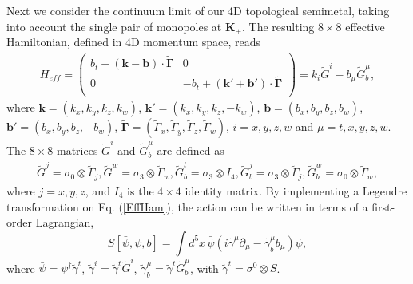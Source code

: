\documentclass[twocolumn,prl,10pt,superscriptaddress]{revtex4}
\begin{document}
\begin{appendix}
Next we consider the continuum limit of our 4D topological semimetal, taking into account the single pair of monopoles at ${\boldsymbol K}_{\pm}$. The resulting $8\times8$ effective Hamiltonian, defined in 4D momentum space, reads
\begin{equation}
\begin{aligned}\label{EffHam}
H_{eff}=
\left(
  \begin{array}{cc}
    b_t+({\boldsymbol k}-{\boldsymbol b})\cdot{\tilde{\boldsymbol\Gamma}} & 0 \\
    0 & -b_t+({\boldsymbol k}'+{\boldsymbol b}')\cdot{\tilde{\boldsymbol\Gamma}} \\
  \end{array}
\right)=k_{i}\tilde{G}^{i}-b_{\mu}\tilde{G}_b^{\mu},
\end{aligned}
\end{equation}
where ${\boldsymbol k}=(k_x,k_y,k_z,k_w)$, ${\boldsymbol k}'=(k_x,k_y,k_z,-k_w)$, ${\boldsymbol b}=(b_x,b_y,b_z,b_w)$, ${\boldsymbol b}'=(b_x,b_y,b_z,-b_w)$, ${\tilde{\boldsymbol \Gamma}}=(\tilde{\Gamma}_x,\tilde{\Gamma}_y,\tilde{\Gamma}_z,\tilde{\Gamma}_w)$, $i=x,y,z,w$ and $\mu=t,x,y,z,w$. The $8\times8$ matrices $\tilde{G}^{i}$ and $\tilde{G}_b^{\mu}$ are defined as
\begin{eqnarray}
  \tilde{G}^{j}=\sigma_0\otimes\tilde{\Gamma}_{j}, \tilde{G}^{w}=\sigma_3\otimes\tilde{\Gamma}_{w}, \tilde{G}^{t}_b=\sigma_3\otimes I_4,   \tilde{G}^{j}_b=\sigma_3\otimes\tilde{\Gamma}_{j}, \tilde{G}^{w}_b=\sigma_0\otimes\tilde{\Gamma}_{w},
  \end{eqnarray}
  where $j=x,y,z$, and $I_4$ is the $4\times4$ identity matrix. By implementing a Legendre transformation on Eq. (\ref{EffHam}), the action can be written in terms of a first-order Lagrangian,
\begin{equation}
S[\bar{\psi},\psi,b]=\int d^5x\,\bar{\psi}(i\tilde{\gamma}^{\mu}\partial_{\mu}-\tilde{\gamma}^{\mu}_bb_{\mu})\psi,
\end{equation}
where $\bar{\psi}=\psi^{\dagger}\tilde{\gamma}^t$, $\tilde{\gamma}^{i}=\tilde{\gamma}^t\tilde{G}^{i}$, $\tilde{\gamma}^{\mu}_b=\tilde{\gamma}^t\tilde{G}_b^{\mu}$, with $\tilde{\gamma}^t=\sigma^0\otimes S$.



\end{appendix}
\end{document}
